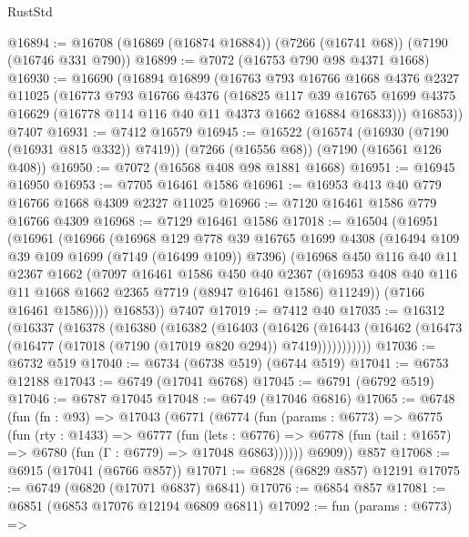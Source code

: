 \begin{lexlean}{RustStd}
\begin{coremodule}
@16894 := @16708 (@16869 (@16874 @16884)) (@7266 (@16741 @68)) (@7190 (@16746 @331 @790))
@16899 := @7072 (@16753 @790 @98 @4371 @1668)
@16930 := @16690
    (@16894
      @16899
      (@16763
        @793
        @16766
        @1668
        @4376
        @2327
        @11025
        (@16773
          @793
          @16766
          @4376
          (@16825
            @117
            @39
            @16765
            @1699
            @4375
            @16629
            (@16778 @114 @116 @40 @11 @4373 @1662 @16884 @16833)))
        @16853))
    @7407
@16931 := @7412 @16579
@16945 := @16522
    (@16574 (@16930 (@7190 (@16931 @815 @332)) @7419))
    (@7266 (@16556 @68))
    (@7190 (@16561 @126 @408))
@16950 := @7072 (@16568 @408 @98 @1881 @1668)
@16951 := @16945 @16950
@16953 := @7705 @16461 @1586
@16961 := @16953 @413 @40 @779 @16766 @1668 @4309 @2327 @11025
@16966 := @7120 @16461 @1586 @779 @16766 @4309
@16968 := @7129 @16461 @1586
@17018 := @16504
    (@16951
      (@16961
        (@16966
          (@16968
            @129
            @778
            @39
            @16765
            @1699
            @4308
            (@16494 @109 @39 @109 @1699 (@7149 (@16499 @109)) @7396)
            (@16968
              @450
              @116
              @40
              @11
              @2367
              @1662
              (@7097
                @16461
                @1586
                @450
                @40
                @2367
                (@16953 @408 @40 @116 @11 @1668 @1662 @2365 @7719 (@8947 @16461 @1586) @11249))
              (@7166 @16461 @1586))))
        @16853))
    @7407
@17019 := @7412 @40
@17035 := @16312
    (@16337
      (@16378
        (@16380
          (@16382
            (@16403
              (@16426
                (@16443 (@16462 (@16473 (@16477 (@17018 (@7190 (@17019 @820 @294)) @7419)))))))))))
@17036 := @6732 @519
@17040 := @6734 (@6738 @519) (@6744 @519)
@17041 := @6753 @12188
@17043 := @6749 (@17041 @6768)
@17045 := @6791 (@6792 @519)
@17046 := @6787 @17045
@17048 := @6749 (@17046 @6816)
@17065 := @6748
    (fun (fn : @93) =>
    @17043
      (@6771
        (@6774
          (fun (params : @6773) =>
          @6775
            (fun (rty : @1433) =>
            @6777
              (fun (lets : @6776) =>
              @6778 (fun (tail : @1657) => @6780 (fun (Γ : @6779) => @17048 @6863))))))
        @6909))
    @857
@17068 := @6915 (@17041 (@6766 @857))
@17071 := @6828 (@6829 @857) @12191
@17075 := @6749 (@6820 (@17071 @6837) @6841)
@17076 := @6854 @857
@17081 := @6851 (@6853 @17076 @12194 @6809 @6811)
@17092 := fun (params : @6773) =>

\end{coremodule}
\end{lexlean}
